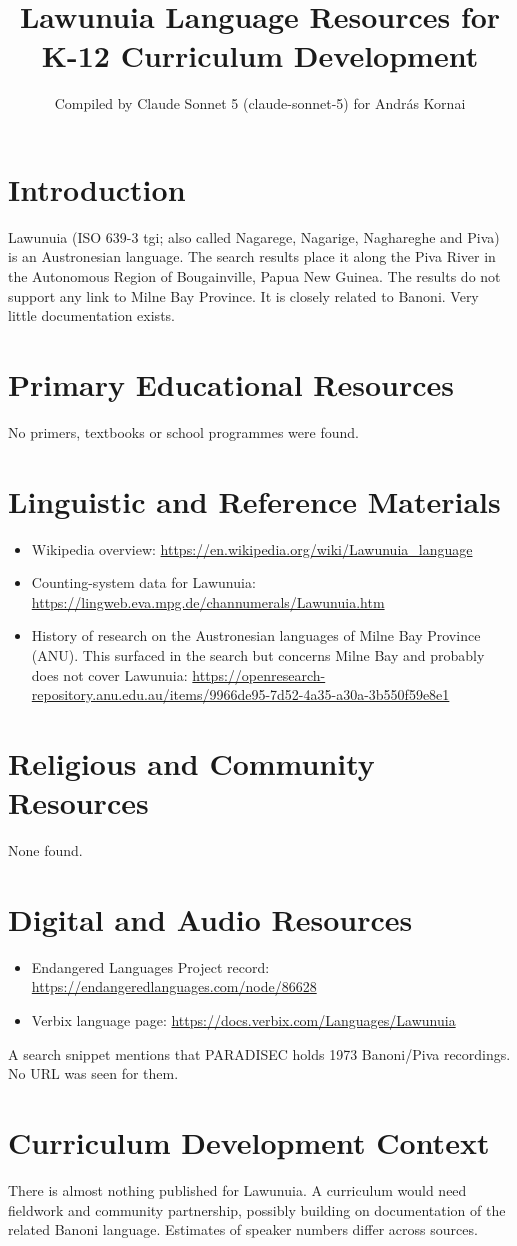 \documentclass[12pt]{article}
\title{Lawunuia Language Resources for K-12 Curriculum Development}
\author{Compiled by Claude Sonnet 5 (claude-sonnet-5) for Andr\'as Kornai}
\date{}
\begin{document}
\maketitle

\section{Introduction}
Lawunuia (ISO 639-3 tgi; also called Nagarege, Nagarige, Naghareghe and Piva) is an Austronesian language. The search results place it along the Piva River in the Autonomous Region of Bougainville, Papua New Guinea. The results do not support any link to Milne Bay Province. It is closely related to Banoni. Very little documentation exists.

\section{Primary Educational Resources}
No primers, textbooks or school programmes were found.

\section{Linguistic and Reference Materials}
\begin{itemize}
\item Wikipedia overview: \url{https://en.wikipedia.org/wiki/Lawunuia_language}
\item Counting-system data for Lawunuia: \url{https://lingweb.eva.mpg.de/channumerals/Lawunuia.htm}
\item History of research on the Austronesian languages of Milne Bay Province (ANU). This surfaced in the search but concerns Milne Bay and probably does not cover Lawunuia: \url{https://openresearch-repository.anu.edu.au/items/9966de95-7d52-4a35-a30a-3b550f59e8e1}
\end{itemize}

\section{Religious and Community Resources}
None found.

\section{Digital and Audio Resources}
\begin{itemize}
\item Endangered Languages Project record: \url{https://endangeredlanguages.com/node/86628}
\item Verbix language page: \url{https://docs.verbix.com/Languages/Lawunuia}
\end{itemize}
A search snippet mentions that PARADISEC holds 1973 Banoni/Piva recordings. No URL was seen for them.

\section{Curriculum Development Context}
There is almost nothing published for Lawunuia. A curriculum would need fieldwork and community partnership, possibly building on documentation of the related Banoni language. Estimates of speaker numbers differ across sources.
\end{document}
